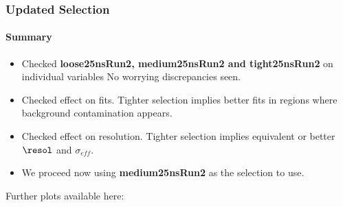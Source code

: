 \documentclass[8pt,serif]{beamer}
\begin{document}
\begin{frame}
\frametitle{Updated Selection}
\framesubtitle{Summary}

\vspace{10mm}

\begin{itemize}
\item Checked \textbf{loose25nsRun2, medium25nsRun2 and tight25nsRun2} on individual variables
\subitem No worrying discrepancies seen.
\item Checked effect on fits. 
\subitem Tighter selection implies better fits in regions where background contamination appears.
\item Checked effect on resolution. 
\subitem Tighter selection implies equivalent or better $\resol$ and $\sigma_{eff}$.
\item We proceed now using \textbf{medium25nsRun2} as the selection to use.
\end{itemize}
  
Further plots available here:	\href{https://lcorpe.web.cern.ch/lcorpe/MoCa/data-data/moca-talk-131115/data-data-data-selection-plots/}{}
\end{frame}
\end{document}
